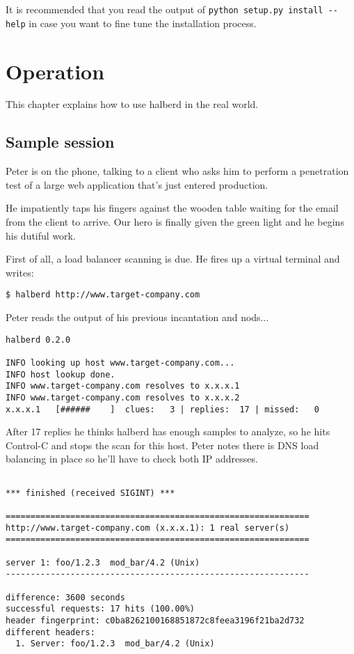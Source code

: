 \documentclass[a4paper]{book}
\begin{document}
It is recommended that you read the output of
\verb|python setup.py install --help| in case you want to fine tune the
installation process.

\chapter{Operation}

This chapter explains how to use halberd in the real world.

\section{Sample session}

Peter is on the phone, talking to a client who asks him to perform a
penetration test of a large web application that's just entered production.

He impatiently taps his fingers against the wooden table waiting for the email
from the client to arrive.  Our hero is finally given the green light and he
begins his dutiful work.

First of all, a load balancer scanning is due.  He fires up a virtual terminal
and writes:

\begin{verbatim}
$ halberd http://www.target-company.com
\end{verbatim}

Peter reads the output of his previous incantation and nods...


\begin{verbatim}
halberd 0.2.0

INFO looking up host www.target-company.com...
INFO host lookup done.
INFO www.target-company.com resolves to x.x.x.1
INFO www.target-company.com resolves to x.x.x.2
x.x.x.1   [######    ]  clues:   3 | replies:  17 | missed:   0
\end{verbatim}

After 17 replies he thinks halberd has enough samples to analyze, so he hits
Control-C and stops the scan for this host.  Peter notes there is DNS load
balancing in place so he'll have to check both IP addresses.

\begin{verbatim}

*** finished (received SIGINT) ***

=============================================================
http://www.target-company.com (x.x.x.1): 1 real server(s)
=============================================================

server 1: foo/1.2.3  mod_bar/4.2 (Unix)
-------------------------------------------------------------

difference: 3600 seconds
successful requests: 17 hits (100.00%)
header fingerprint: c0ba8262100168851872c8feea3196f21ba2d732
different headers:
  1. Server: foo/1.2.3  mod_bar/4.2 (Unix)
\end{verbatim}
\end{document}
